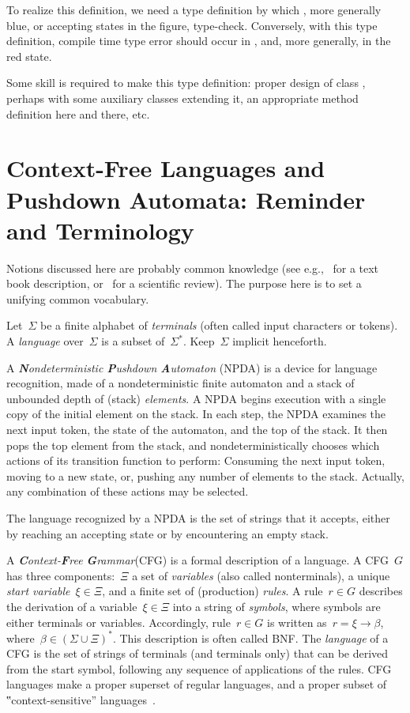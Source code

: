 \documentclass[a4paper,USenglish]{lipics-v2016}
\begin{document}
To realize this definition, we need a type definition by which , more generally
  blue, or accepting states in the figure, type-check.
Conversely, with this type definition, compile time type error should occur in ,
  and, more generally, in the red state.

Some skill is required to make this type definition: proper design of class , perhaps with
  some auxiliary classes extending it, an appropriate method definition here and there, etc.
 
\section{Context-Free Languages and Pushdown Automata: Reminder and Terminology}
\label{section:pushdown}
Notions discussed here are probably common knowledge
 (see e.g.,~\cite{Hopcroft:Ullman:01,Linz:2001} for a text book description,
 or~\cite{Autebert:97} for a scientific review).
The purpose here is to set a unifying common vocabulary.

Let~$Σ$ be a finite alphabet of \emph{terminals} (often called input characters or tokens).
A \emph{language} over~$Σ$
  is a subset of~$Σ^*$.
Keep~$Σ$ implicit henceforth.

A \emph{\textbf Nondeterministic \textbf Pushdown \textbf Automaton} (NPDA) is a device for language recognition,
  made of a nondeterministic finite automaton
  and a stack of unbounded depth of (stack) \emph{elements}.
A NPDA begins execution with a single copy of the initial element on the stack.
In each step, the NPDA
  examines the next input token,
  the state of the automaton,
  and the top of the stack.
It then pops the top element from the stack, and nondeterministically chooses which actions of
  its transition function to perform:
  Consuming the next input token,
  moving to a new state,
  or, pushing any number of elements to the stack.
Actually, any combination of these actions may be selected.

The language recognized by a NPDA is the set of strings that it accepts,
  either by reaching an accepting state or by encountering an empty stack.

A \emph{\textbf Context-\textbf Free \textbf Grammar}(CFG) is a formal description of a language.
A CFG~$G$ has three components:~$Ξ$ a set of \emph{variables} (also called nonterminals),
  a unique \emph{start variable}~$ξ∈Ξ$, and a finite set of (production) \emph{rules}.
A rule~$r∈G$ describes the derivation of a variable~$ξ∈Ξ$ into
  a string of \emph{symbols}, where symbols are either terminals or variables.
Accordingly, rule~$r∈G$ is written as~$r=ξ→β$, where~$β∈\left(Σ∪Ξ\right)^*$.
This description is often called BNF\@.
The \emph{language} of a CFG is the set of strings of terminals (and terminals only)
  that can be derived from the start symbol, following any sequence of applications of the rules.
CFG languages make a proper superset of regular languages, and a proper subset of 
  ‟context-sensitive” languages~\cite{Hopcroft:Ullman:01}.
\end{document}
